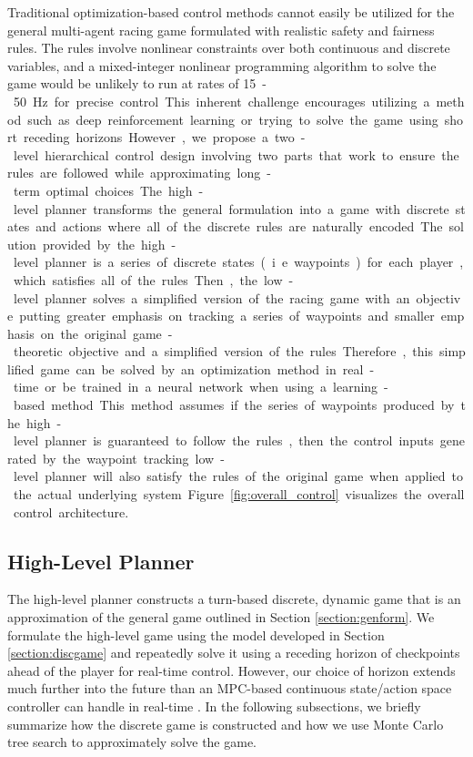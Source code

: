 Traditional optimization-based control methods cannot easily be utilized for the general multi-agent racing game formulated with realistic safety and fairness rules. The rules involve nonlinear constraints over both continuous and discrete variables, and a mixed-integer nonlinear programming algorithm to solve the game would be unlikely to run at rates of \SI{15}-\SI{50}{\hertz} for precise control. This inherent challenge encourages utilizing a method such as deep reinforcement learning or trying to solve the game using short receding horizons. 

However, we propose a two-level hierarchical control design involving two parts that work to ensure the rules are followed while approximating long-term optimal choices. The high-level planner transforms the general formulation into a game with discrete states and actions where all of the discrete rules are naturally encoded. The solution provided by the high-level planner is a series of discrete states (i.e waypoints) for each player, which satisfies all of the rules. Then, the low-level planner solves a simplified version of the racing game with an objective putting greater emphasis on tracking a series of waypoints and smaller emphasis on the original game-theoretic objective and a simplified version of the rules. Therefore, this simplified game can be solved by an optimization method in real-time or be trained in a neural network when using a learning-based method. 

This method assumes if the series of waypoints produced by the high-level planner is guaranteed to follow the rules, then the control inputs generated by the waypoint tracking low-level planner will also satisfy the rules of the original game when applied to the actual underlying system. Figure \ref{fig:overall_control} visualizes the overall control architecture. 

\subsection{High-Level Planner}
The high-level planner constructs a turn-based discrete, dynamic game that is an approximation of the general game outlined in Section \ref{section:genform}. We formulate the high-level game using the model developed in Section \ref{section:discgame} and repeatedly solve it using a receding horizon of checkpoints ahead of the player for real-time control. However, our choice of horizon extends much further into the future than an MPC-based continuous state/action space controller can handle in real-time \cite{Wang2019}. In the following subsections, we briefly summarize how the discrete game is constructed and how we use Monte Carlo tree search to approximately solve the game.

